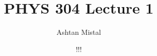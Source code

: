 \documentclass{article}
\title{PHYS 304 Lecture 1}
\author{Ashtan Mistal}
\date{!!!}
\begin{document}
\ifstandalone
\maketitle
\fi

\graphicspath{{./Lecture01/}}
\end{document}
